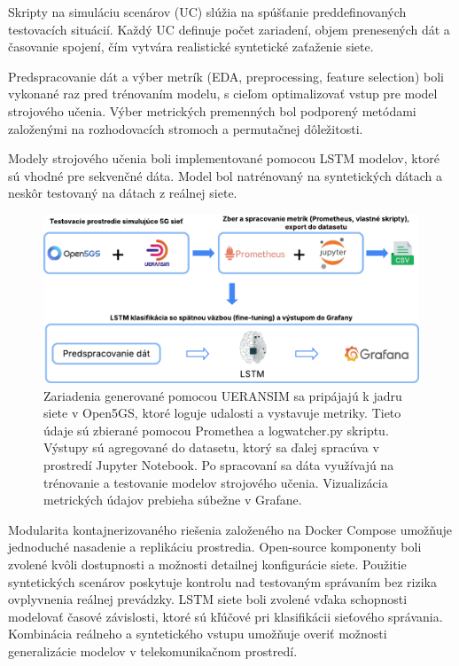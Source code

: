 Skripty na simuláciu scenárov (UC) slúžia na spúšťanie preddefinovaných testovacích situácií. Každý UC definuje počet zariadení, objem prenesených dát a časovanie spojení, čím vytvára realistické syntetické zaťaženie siete.

Predspracovanie dát a výber metrík (EDA, preprocessing, feature selection) boli vykonané raz pred trénovaním modelu, s cieľom optimalizovať vstup pre model strojového učenia. Výber metrických premenných bol podporený metódami založenými na rozhodovacích stromoch a permutačnej dôležitosti.

Modely strojového učenia boli implementované pomocou LSTM modelov, ktoré sú vhodné pre sekvenčné dáta. Model bol natrénovaný na syntetických dátach a neskôr testovaný na dátach z reálnej siete.

\begin{figure}[H]
    \centering
    \includegraphics[width=0.95\linewidth]{assets//images/arch2.png}
    \caption{Zariadenia generované pomocou UERANSIM sa pripájajú k jadru siete v Open5GS, ktoré loguje udalosti a vystavuje metriky. Tieto údaje sú zbierané pomocou Promethea a logwatcher.py skriptu. Výstupy sú agregované do datasetu, ktorý sa ďalej spracúva v prostredí Jupyter Notebook. Po spracovaní sa dáta využívajú na trénovanie a testovanie modelov strojového učenia. Vizualizácia metrických údajov prebieha súbežne v Grafane.}
    \label{fig:arch}
\end{figure}

Modularita kontajnerizovaného riešenia založeného na Docker Compose umožňuje jednoduché nasadenie a replikáciu prostredia. Open-source komponenty boli zvolené kvôli dostupnosti a možnosti detailnej konfigurácie siete. Použitie syntetických scenárov poskytuje kontrolu nad testovaným správaním bez rizika ovplyvnenia reálnej prevádzky. LSTM siete boli zvolené vďaka schopnosti modelovať časové závislosti, ktoré sú kľúčové pri klasifikácii sieťového správania. Kombinácia reálneho a syntetického vstupu umožňuje overiť možnosti generalizácie modelov v telekomunikačnom prostredí.